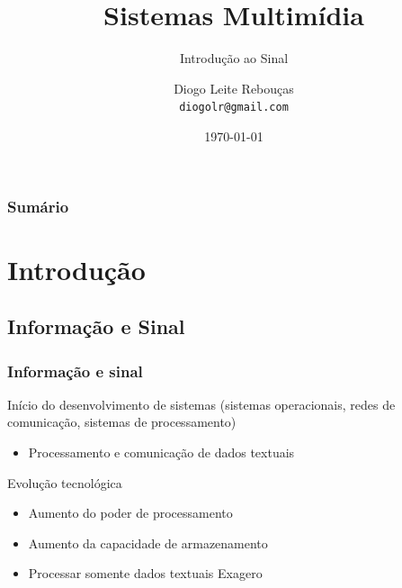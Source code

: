 \documentclass[xcolor]{beamer}
\title[Sistemas Multimídia]
{
    Sistemas Multimídia
}
\subtitle{Introdução ao Sinal}
\author[Diogo Leite Rebouças]
{
    Diogo Leite Rebouças\\
    {\tt diogolr@gmail.com}
}
\institute
{
    Universidade do Estado do Rio Grande do Norte\\
    Departamento de Informática
}
\date{\today}
\begin{document}
\maketitle


\begin{frame}
    \frametitle{Sumário}
    \tableofcontents
\end{frame}

\section{Introdução}
\subsection{Informação e Sinal}
\begin{frame}
    \frametitle{Informação e sinal}

    Início do desenvolvimento de sistemas (sistemas operacionais, redes de
    comunicação, sistemas de processamento)

    \begin{itemize}
        \item Processamento e comunicação de dados textuais
    \end{itemize}

    Evolução tecnológica

    \begin{itemize}
        \item Aumento do poder de processamento
        \item Aumento da capacidade de armazenamento
        \item Processar somente dados textuais \implica Exagero
    \end{itemize}
\end{frame}
\end{document}
